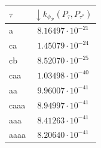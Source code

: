 \begin{table}[!t]
{\begin{tabular}{l|c}
			{$\tau$} &
			{$\boldsymbol{\downarrow}k_{\phi_{\mathcal{P}}}(P_\tau,P_{\tau^*})$} \\
			
			
			\midrule
			{a}  & $8.16497\cdot10^{-21}$ \\
			{ca}  &   $1.45079\cdot10^{-24}$\\
			{cb}  &   $8.52070\cdot10^{-25}$\\
			{caa}  & $1.03498\cdot10^{-40}$\\
			{aa}  &  $9.96007\cdot10^{-41}$ \\
			{caaa}  &  $8.94997\cdot10^{-41}$ \\
			{aaa}  &  $8.41263\cdot10^{-41}$\\
			{aaaa}  & $8.20640\cdot10^{-41}$\\
			\bottomrule
	\end{tabular}}
%	
%		
%		
\end{table}

